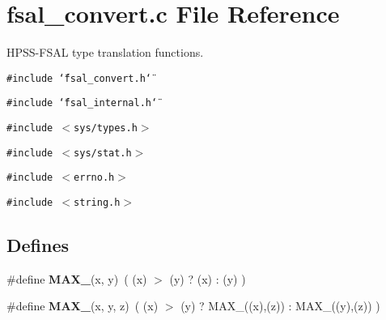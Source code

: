 \section{fsal\_\-convert.c File Reference}
\label{fsal__convert_8c}
HPSS-FSAL type translation functions. 

{\tt \#include \char`\"{}fsal\_\-convert.h\char`\"{}}\par
{\tt \#include \char`\"{}fsal\_\-internal.h\char`\"{}}\par
{\tt \#include $<$sys/types.h$>$}\par
{\tt \#include $<$sys/stat.h$>$}\par
{\tt \#include $<$errno.h$>$}\par
{\tt \#include $<$string.h$>$}\par
\subsection*{Defines}
\begin{CompactItemize}
\item 
\#define {\bf MAX\_}(x, y)\ ( (x) $>$ (y) ? (x) : (y) )\label{fsal__convert_8c_a0}

\item 
\#define {\bf MAX\_}(x, y, z)\ ( (x) $>$ (y) ? MAX\_((x),(z)) : MAX\_((y),(z)) )\label{fsal__convert_8c_a1}

\end{CompactItemize}
